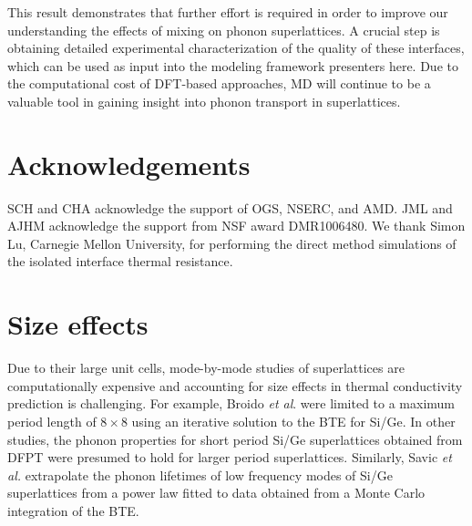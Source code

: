 \documentclass[aps,prb,preprint,preprintnumbers,amsmath,amssymb,floatfix,superscriptaddress]{revtex4}
\begin{document}
This result demonstrates that further effort is required in order to improve our understanding the effects of mixing on phonon superlattices. A crucial step is obtaining detailed experimental characterization of the quality of these interfaces, which can be used as input into the modeling framework presenters here. Due to the computational cost of DFT-based approaches, MD will continue to be a valuable tool in gaining insight into phonon transport in superlattices. 



\section{Acknowledgements}
SCH and CHA acknowledge the support of OGS, NSERC, and AMD. JML and AJHM acknowledge the support from NSF award DMR1006480. We thank Simon Lu, Carnegie Mellon University, for performing the direct method simulations of the isolated interface thermal resistance.

\newpage
\appendix
\section{Size effects}\label{app:size effects}
Due to their large unit cells, mode-by-mode studies of superlattices are computationally expensive and accounting for size effects in thermal conductivity prediction is challenging. For example, Broido \textit{et al}. were limited to a maximum period length of $8\times 8$ using an iterative solution to the BTE for Si/Ge.\cite {PhysRevB.70.081310} In other studies, the phonon properties for short period Si/Ge superlattices obtained from DFPT were presumed to hold for larger period superlattices.\cite{Luckyanova16112012, doi:10.1021/nl202186y} Similarly, Savic \textit{et al.} extrapolate the phonon lifetimes of low frequency modes of Si/Ge superlattices from a power law fitted to data obtained from a Monte Carlo integration of the BTE.\cite{savic:073113} 
\end{document}
